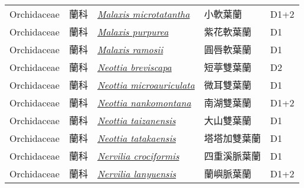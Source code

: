 {\begin{longtable}{p{2.5cm}p{2.5cm}p{4.5cm}p{2.5cm}p{3cm}}
    Orchidaceae & 蘭科 & \href{http://www.theplantlist.org/tpl1.1/search?q=Malaxis+microtatantha}{\textit{Malaxis microtatantha} } & 小軟葉蘭 & D1+2 \index{Malaxis@\textit{Malaxis}!microtatantha@\textit{microtatantha}}  \index{小軟葉蘭} \\
    Orchidaceae & 蘭科 & \href{http://www.theplantlist.org/tpl1.1/search?q=Malaxis+purpurea}{\textit{Malaxis purpurea} } & 紫花軟葉蘭 & D1 \index{Malaxis@\textit{Malaxis}!purpurea@\textit{purpurea}}  \index{紫花軟葉蘭} \\
    Orchidaceae & 蘭科 & \href{http://www.theplantlist.org/tpl1.1/search?q=Malaxis+ramosii}{\textit{Malaxis ramosii} } & 圓唇軟葉蘭 & D1 \index{Malaxis@\textit{Malaxis}!ramosii@\textit{ramosii}}  \index{圓唇軟葉蘭} \\
    Orchidaceae & 蘭科 & \href{http://www.theplantlist.org/tpl1.1/search?q=Neottia+breviscapa}{\textit{Neottia breviscapa} } & 短葶雙葉蘭 & D2 \index{Neottia@\textit{Neottia}!breviscapa@\textit{breviscapa}}  \index{短葶雙葉蘭} \\
    Orchidaceae & 蘭科 & \href{http://www.theplantlist.org/tpl1.1/search?q=Neottia+microauriculata}{\textit{Neottia microauriculata} } & 微耳雙葉蘭 & D1 \index{Neottia@\textit{Neottia}!microauriculata@\textit{microauriculata}}  \index{微耳雙葉蘭} \\
    Orchidaceae & 蘭科 & \href{http://www.theplantlist.org/tpl1.1/search?q=Neottia+nankomontana}{\textit{Neottia nankomontana} } & 南湖雙葉蘭 & D1+2 \index{Neottia@\textit{Neottia}!nankomontana@\textit{nankomontana}}  \index{南湖雙葉蘭} \\
    Orchidaceae & 蘭科 & \href{http://www.theplantlist.org/tpl1.1/search?q=Neottia+taizanensis}{\textit{Neottia taizanensis} } & 大山雙葉蘭 & D1 \index{Neottia@\textit{Neottia}!taizanensis@\textit{taizanensis}}  \index{大山雙葉蘭} \\
    Orchidaceae & 蘭科 & \href{http://www.theplantlist.org/tpl1.1/search?q=Neottia+tatakaensis}{\textit{Neottia tatakaensis} } & 塔塔加雙葉蘭 & D1 \index{Neottia@\textit{Neottia}!tatakaensis@\textit{tatakaensis}}  \index{塔塔加雙葉蘭} \\
    Orchidaceae & 蘭科 & \href{http://www.theplantlist.org/tpl1.1/search?q=Nervilia+crociformis}{\textit{Nervilia crociformis} } & 四重溪脈葉蘭 & D1 \index{Nervilia@\textit{Nervilia}!crociformis@\textit{crociformis}}  \index{四重溪脈葉蘭} \\
    Orchidaceae & 蘭科 & \href{http://www.theplantlist.org/tpl1.1/search?q=Nervilia+lanyuensis}{\textit{Nervilia lanyuensis} } & 蘭嶼脈葉蘭 & D1+2 \index{Nervilia@\textit{Nervilia}!lanyuensis@\textit{lanyuensis}}  \index{蘭嶼脈葉蘭} \\

\end{longtable}}
